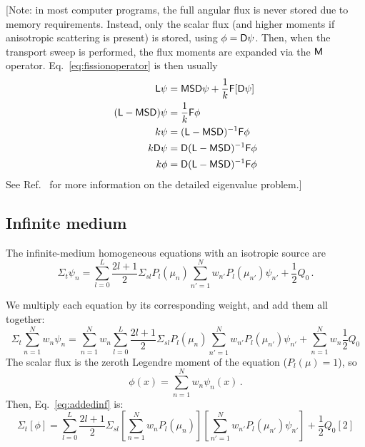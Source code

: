\documentclass[]{SRJcommon}
\begin{document}
[Note: in most computer programs, the full angular flux is never stored due to
memory requirements. Instead, only the scalar flux (and higher moments if
anisotropic scattering is present) is stored, using $\phi = \mathsf{D} \psi$. Then,
when the transport sweep is performed, the flux moments are expanded via the
$\mathsf{M}$ operator. Eq.~\eqref{eq:fissionoperator} is then
usually
\begin{align*}
\mathsf{L} \psi &= \mathsf{M} \mathsf{S} \mathsf{D} \psi +  \frac{1}{k} \mathsf{F} [\mathsf{D} \psi]
\\
( \mathsf{L} -  \mathsf{M} \mathsf{S} \mathsf{D} ) \psi &=  \frac{1}{k} \mathsf{F} \phi
\\
k \psi &=  ( \mathsf{L} - \mathsf{M} \mathsf{S} \mathsf{D} ) ^{-1} \mathsf{F} \phi
\\
k \mathsf{D} \psi &= \mathsf{D}  ( \mathsf{L} - \mathsf{M} \mathsf{S} \mathsf{D} ) ^{-1} \mathsf{F} \phi
\\
k \phi &= \mathsf{D} ( \mathsf{L} - \mathsf{M} \mathsf{S} \mathsf{D} ) ^{-1} \mathsf{F} \phi
\end{align*}
See Ref.~\cite{War2004a} for more information on the detailed eigenvalue
problem.]

\subsection{Infinite medium}
The infinite-medium homogeneous \SN{} equations with an isotropic source are
$$\Sigma_t \psi_n 
= \sum_{l=0}^{L}  \frac{2l+1}{2} \Sigma_{sl} P_{l}(\mu_n)
  \sum_{n'=1}^{N} w_{n'} P_{l} (\mu_{n'}) \psi_{n'}
  + \frac{1}{2} Q_0 \,.$$

We multiply each equation by its corresponding weight, and add them all
together:
\begin{equation}
\Sigma_t \sum_{n=1}^{N} w_{n} \psi_{n} 
= \sum_{n=1}^{N} w_{n} \sum_{l=0}^{L}  \frac{2l+1}{2} \Sigma_{sl} P_{l}(\mu_n)
  \sum_{n'=1}^{N} w_{n'} P_{l} (\mu_{n'}) \psi_{n'}
  + \sum_{n=1}^{N} w_{n} \frac{1}{2} Q_0
  \label{eq:addedinf}
\end{equation}
The scalar flux is the zeroth Legendre moment of the equation ($P_l(\mu) = 1$),
so
$$ \phi(x) = \sum_{n=1}^{N} w_{n} \psi_{n}(x) \,.$$
Then, Eq.~\eqref{eq:addedinf} is:
$$ \Sigma_t [\phi] 
= \sum_{l=0}^{L}  \frac{2l+1}{2} \Sigma_{sl} \left[ \sum_{n=1}^{N} w_{n}
P_{l}(\mu_n) \right] \left[ \sum_{n'=1}^{N} w_{n'} P_{l} (\mu_{n'}) \psi_{n'}
\right] + \frac{1}{2} Q_0 [2] $$
\end{document}
